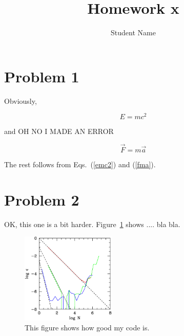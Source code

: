 
\pagestyle{plain}
\baselineskip 18pt
\textwidth 6.5in
\textheight 7.8in
\oddsidemargin 0.1in
\evensidemargin 0.1in
\topmargin 0.3in
\parindent 0pt

\newcommand{\beq}{\begin{equation}}
  \newcommand{\eeq}{\end{equation}}
\def\om{\Omega_m}




\title{Homework x}
\author{Student Name}
\maketitle

\section{Problem 1}

Obviously,

\beq
E=m c^2
\label{emc2}
\eeq

and OH NO I MADE AN ERROR

\beq
\vec{F} = m \vec{a}
\label{fma}
\eeq

The rest follows from Eqs.~(\ref{emc2}) and (\ref{fma}).

\section{Problem 2}


OK, this one is a bit harder. Figure~\ref{figeps} shows .... bla bla.

\begin{figure}[h]
\begin{center}
\includegraphics[width=0.4\textwidth]{figure1.ps}
\caption{This figure shows how good my code is.}
\label{figeps}
\end{center}
\end{figure}




